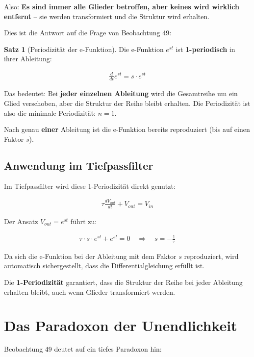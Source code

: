 \documentclass[a4paper,12pt,twoside]{report}
\theoremstyle{definition}
\newtheorem{satz}{Satz}
\begin{document}
Also: \textbf{Es sind immer alle Glieder betroffen, aber keines wird wirklich entfernt} -- sie werden transformiert und die Struktur wird erhalten.

Dies ist die Antwort auf die Frage von Beobachtung 49:

\begin{satz}[Periodizität der e-Funktion]
	Die e-Funktion $e^{st}$ ist \textbf{1-periodisch} in ihrer Ableitung:
	
	\begin{align}
		\frac{d}{dt} e^{st} = s \cdot e^{st}
	\end{align}
	
	Das bedeutet: Bei \textbf{jeder einzelnen Ableitung} wird die Gesamtreihe um ein Glied verschoben, aber die Struktur der Reihe bleibt erhalten. Die Periodizität ist also die minimale Periodizität: $n = 1$.
	
	Nach genau \textbf{einer} Ableitung ist die e-Funktion bereits reproduziert (bis auf einen Faktor $s$).
\end{satz}

\subsection{Anwendung im Tiefpassfilter}

Im Tiefpassfilter wird diese 1-Periodizität direkt genutzt:

\begin{align}
	\tau \frac{dV_{out}}{dt} + V_{out} = V_{in}
\end{align}

Der Ansatz $V_{out} = e^{st}$ führt zu:

\begin{align}
	\tau \cdot s \cdot e^{st} + e^{st} = 0 \quad \Rightarrow \quad s = -\frac{1}{\tau}
\end{align}

Da sich die e-Funktion bei der Ableitung mit dem Faktor $s$ reproduziert, wird automatisch sichergestellt, dass die Differentialgleichung erfüllt ist.

Die \textbf{1-Periodizität} garantiert, dass die Struktur der Reihe bei jeder Ableitung erhalten bleibt, auch wenn Glieder transformiert werden.

\section{Das Paradoxon der Unendlichkeit}

Beobachtung 49 deutet auf ein tiefes Paradoxon hin:
\end{document}
